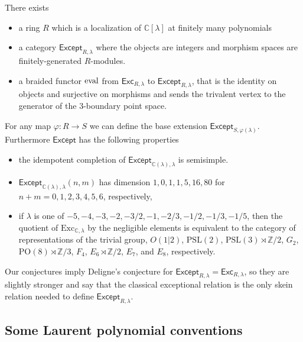 \documentclass[12pt]{amsart}
\begin{document}
\begin{conjecture}
There exists
  \begin{itemize}
  \item a ring $R$ which is a localization of $\mathbb{C}[\lambda]$ at finitely many polynomials
  \item a category $\mathsf{Except}_{R,\lambda}$ where the objects are integers and morphism spaces are finitely-generated $R$-modules.
  \item a braided functor $\operatorname{eval}$ from $\mathsf{Exc}_{R,\lambda}$ to $\mathsf{Except}_{R,\lambda}$, that is the identity on objects and surjective on morphisms and sends the trivalent vertex to the generator of the $3$-boundary point space. 
  \end{itemize}
For any map $\varphi: R \rightarrow S$ we can define the base extension $\mathsf{Except}_{S,\varphi(\lambda)}$.  Furthermore $\mathsf{Except}$ has the following properties
\begin{itemize}
\item the idempotent completion of $\mathsf{Except}_{\mathbb{C}(\lambda),\lambda}$ is semisimple.
\item $\mathsf{Except}_{\mathbb{C}(\lambda),\lambda}(n,m)$ has dimension $1,\allowbreak0,\allowbreak1,\allowbreak1,\allowbreak5,\allowbreak16,\allowbreak80$
for $n+m=0,1,2,3,4,5,6$, respectively, 
\item if $\lambda$ is one of $-5, -4, -3, -2, -3/2,-1,-2/3,-1/2,-1/3,-1/5$, then the quotient of $\mathrm{Exc}_{\mathbb{C},\lambda}$ by the negligible elements is equivalent to the category of representations of the trivial group, $O(1 | 2)$, $\mathrm{PSL}(2)$, $\mathrm{PSL}(3) \rtimes \mathbb{Z}/2$, $G_2$, $\mathrm{PO}(8) \rtimes \mathbb{Z}/3$, $F_4$, $E_6 \rtimes \mathbb{Z}/2$, $E_7$, and $E_8$, respectively.
\end{itemize}
\end{conjecture}


Our conjectures imply Deligne's conjecture for $\mathsf{Except}_{R,\lambda} =
\mathsf{Exc}_{R,\lambda}$, so they are slightly stronger and say that the
classical exceptional relation is the only skein relation needed to define
$\mathsf{Except}_{R,\lambda}$.

\subsection{Some Laurent polynomial conventions}
\end{document}
